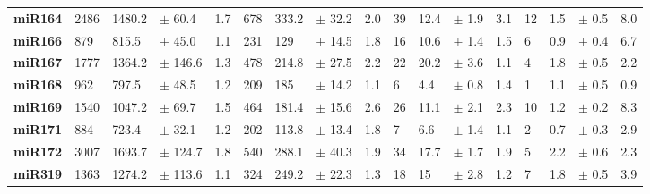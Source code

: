 \begin{landscape}
\begin{table}[]
\begin{tabular}{lllllllllllllllll}
\textbf{miR164}      & 2486           & 1480.2            & $\pm$  60.4      & 1.7            & 678            & 333.2             & $\pm$  32.2      & 2.0            & 39             & 12.4              & $\pm$  1.9       & 3.1            & 12             & 1.5               & $\pm$  0.5       & 8.0            \\
\textbf{miR166}      & 879            & 815.5             & $\pm$  45.0      & 1.1            & 231            & 129               & $\pm$  14.5      & 1.8            & 16             & 10.6              & $\pm$  1.4       & 1.5            & 6              & 0.9               & $\pm$  0.4       & 6.7            \\
\textbf{miR167}      & 1777           & 1364.2            & $\pm$  146.6     & 1.3            & 478            & 214.8             & $\pm$  27.5      & 2.2            & 22             & 20.2              & $\pm$  3.6       & 1.1            & 4              & 1.8               & $\pm$  0.5       & 2.2            \\
\textbf{miR168}      & 962            & 797.5             & $\pm$  48.5      & 1.2            & 209            & 185               & $\pm$  14.2      & 1.1            & 6              & 4.4               & $\pm$  0.8       & 1.4            & 1              & 1.1               & $\pm$  0.5       & 0.9            \\
\textbf{miR169}      & 1540           & 1047.2            & $\pm$  69.7      & 1.5            & 464            & 181.4             & $\pm$  15.6      & 2.6            & 26             & 11.1              & $\pm$  2.1       & 2.3            & 10             & 1.2               & $\pm$  0.2       & 8.3            \\
\textbf{miR171}      & 884            & 723.4             & $\pm$  32.1      & 1.2            & 202            & 113.8             & $\pm$  13.4      & 1.8            & 7              & 6.6               & $\pm$  1.4       & 1.1            & 2              & 0.7               & $\pm$  0.3       & 2.9            \\
\textbf{miR172}      & 3007           & 1693.7            & $\pm$  124.7     & 1.8            & 540            & 288.1             & $\pm$  40.3      & 1.9            & 34             & 17.7              & $\pm$  1.7       & 1.9            & 5              & 2.2               & $\pm$  0.6       & 2.3            \\
\textbf{miR319}      & 1363           & 1274.2            & $\pm$  113.6     & 1.1            & 324            & 249.2             & $\pm$  22.3      & 1.3            & 18             & 15                & $\pm$  2.8       & 1.2            & 7              & 1.8               & $\pm$  0.5       & 3.9            \\

\end{tabular}
\end{table}
\end{landscape}
